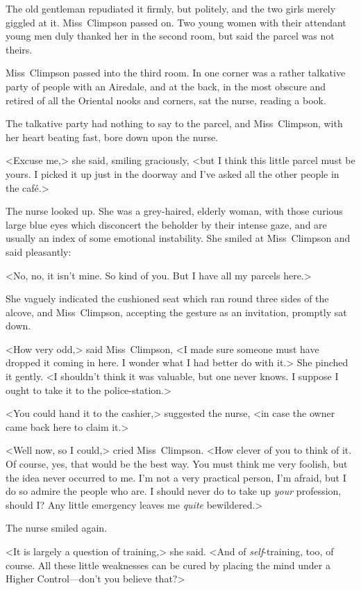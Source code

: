 The old gentleman repudiated it firmly, but politely, and the two girls merely giggled at it. Miss~Climpson passed on. Two young women with their attendant young men duly thanked her in the second room, but said the parcel was not theirs.

Miss~Climpson passed into the third room. In one corner was a rather talkative party of people with an Airedale, and at the back, in the most obscure and retired of all the Oriental nooks and corners, sat the nurse, reading a book.

The talkative party had nothing to say to the parcel, and Miss~Climpson, with her heart beating fast, bore down upon the nurse.

<Excuse me,> she said, smiling graciously, <but I think this little parcel must be yours. I picked it up just in the doorway and I've asked all the other people in the café.>

The nurse looked up. She was a grey-haired, elderly woman, with those curious large blue eyes which disconcert the beholder by their intense gaze, and are usually an index of some emotional instability. She smiled at Miss~Climpson and said pleasantly:

<No, no, it isn't mine. So kind of you. But I have all my parcels here.>

She vaguely indicated the cushioned seat which ran round three sides of the alcove, and Miss~Climpson, accepting the gesture as an invitation, promptly sat down.

<How very odd,> said Miss~Climpson, <I made sure someone must have dropped it coming in here. I wonder what I had better do with it.> She pinched it gently. <I shouldn't think it was valuable, but one never knows. I suppose I ought to take it to the police-station.>

<You could hand it to the cashier,> suggested the nurse, <in case the owner came back here to claim it.>

<Well now, so I could,> cried Miss~Climpson. <How clever of you to think of it. Of course, yes, that would be the best way. You must think me very foolish, but the idea never occurred to me. I'm not a very practical person, I'm afraid, but I do so admire the people who are. I should never do to take up \emph{your} profession, should I? Any little emergency leaves me \emph{quite} bewildered.>

The nurse smiled again.

<It is largely a question of training,> she said. <And of \emph{self}-training, too, of course. All these little weaknesses can be cured by placing the mind under a Higher Control—don't you believe that?>

